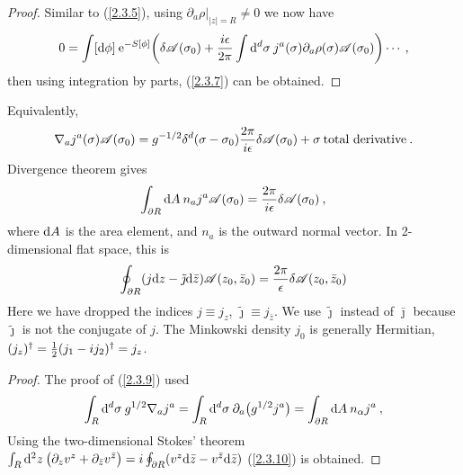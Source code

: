 \begin{tcolorbox}[breakable]
	\begin{proof}
		Similar to (\ref{2.3.5}), using $\partial_a\rho\big\lvert_{|z|=R}\ne0$ we now have    
		\[
		0=\int [\mathrm{d} \phi]\:\mathrm{e}^{-S[\phi]}\biggl(\delta\mathscr{A}(\sigma_{0})+\frac{i\epsilon}{2\pi}\int \mathrm{d}^{d}\sigma \: 
		j^{a}(\sigma)\partial_{a}\rho(\sigma)\mathscr{A}(\sigma_{0}) \biggr) \cdots     \:,
		\]
		then using integration by parts, (\ref{2.3.7}) can be obtained.    
	\end{proof}
\end{tcolorbox}
\noindent Equivalently,    
\begin{equation}
	\nabla_{a} j^{a}(\sigma) \mathscr{A}(\sigma_{0})=g^{-1 / 2} \delta^{d}(\sigma-\sigma_{0}) \frac{2 \pi}{i \epsilon} \delta \mathscr{A}(\sigma_{0})+\sigma \:\text{total derivative} \:.
	\label{2.3.8}
\end{equation}
Divergence theorem gives    
\begin{equation}
	\int_{\partial R} \mathrm{d} A\: n_{a} j^{a} \mathscr{A}(\sigma_{0})=\frac{2 \pi}{i \epsilon} \delta \mathscr{A}(\sigma_{0}) \:,\label{2.3.9}
\end{equation}
where $\mathrm{d} A$ is the area element, and $n_{a}$ is the outward normal vector.    
In 2-dimensional flat space, this is    
\begin{equation} \label{2.3.10}
	\oint_{\partial R}(j\mathrm{d} z-\tilde{\jmath} \mathrm{d} \bar{z}) \mathscr{A}(z_{0}, \bar{z}_{0})
	=\frac{2 \pi}{\epsilon} \delta \mathscr{A}(z_{0}, \bar{z}_{0})
\end{equation}
Here we have dropped the indices $j \equiv j_{z}$, $\tilde{\jmath} \equiv j_{\bar{z}}$. We use $\tilde{\jmath}$ instead of $\bar{\jmath}$ because $\tilde{\jmath}$ is not the conjugate of $j$.    
The Minkowski density $j_0$ is generally Hermitian, $(j_{z})^{\dagger}=\frac{1}{2}(j_{1}-i j_{2})^{\dagger}=j_{z}$.    
\begin{tcolorbox}[breakable]
	\begin{proof}
		The proof of (\ref{2.3.9}) used    
		\[
		\int_{R} \mathrm{d}^{d} \sigma \: g^{1 / 2} \nabla_{a} j^{a} =\int_{R} \mathrm{d} ^d \sigma \: \partial_{a}\bigl(g^{1 / 2} j^{a}\bigr) 
		=\int_{\partial R} \mathrm{d} A\: n_{\alpha} j^{a} \:,
		\]
		Using the two-dimensional Stokes' theorem     $
		\int_{R} \mathrm{d}^{2}z\: \bigl(\partial_{z} v^{z}+\partial_{\bar{z} } v^{\bar{z}}\bigr)=i \oint_{\partial R}(v^{z} \mathrm{d} \bar{z}-v^{\bar{z}} \mathrm{d} \bar{z})
		$ (\ref{2.3.10}) is obtained.    
	\end{proof}
\end{tcolorbox}

